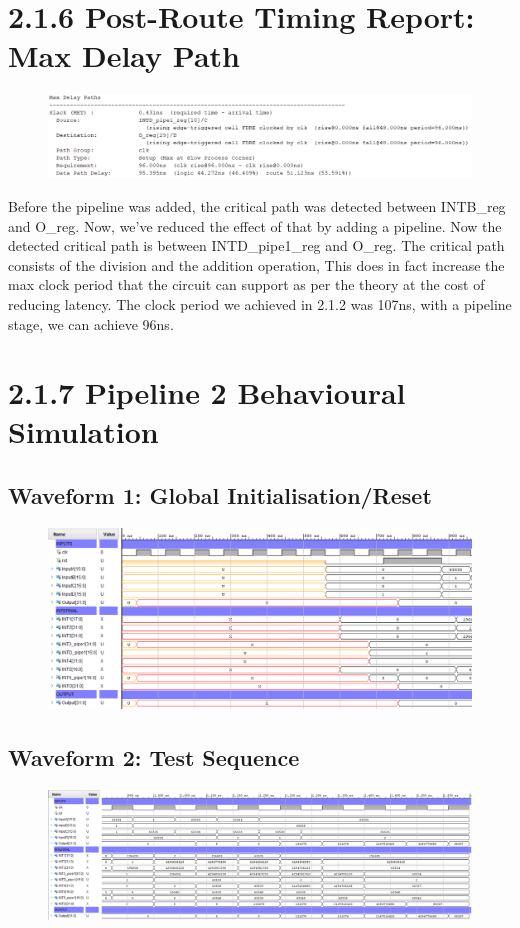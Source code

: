 \documentclass[11pt]{report}
\begin{document}
\section*{2.1.6 Post-Route Timing Report: Max Delay Path}
\begin{figure}[H]
    \includegraphics[width=\columnwidth]{Assets/2.1.6_max-delay-path.png}
\end{figure}
Before the pipeline was added, the critical path was detected between INTB\_reg and O\_reg. Now, we've reduced the effect of that by adding a pipeline. Now the detected critical path is between INTD\_pipe1\_reg and O\_reg. The critical path consists of the division and the addition operation, This does in fact increase the max clock period that the circuit can support as per the theory at the cost of reducing latency. The clock period we achieved in 2.1.2 was 107ns, with a pipeline stage, we can achieve 96ns.

\section*{2.1.7 Pipeline 2 Behavioural Simulation}

\subsection*{Waveform 1: Global Initialisation/Reset}
\begin{figure}[H]
    \includegraphics[width=\columnwidth]{Assets/2.1.7_waveform-initial-reset.png}
\end{figure}

\subsection*{Waveform 2: Test Sequence}
\begin{figure}[H]
    \includegraphics[width=\columnwidth]{Assets/2.1.7_waveform-test-sequence.png}
\end{figure}
\end{document}
